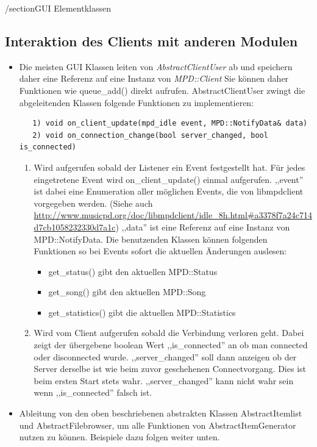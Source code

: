 /section{GUI Elementklassen}
\subsection{Interaktion des Clients mit anderen Modulen}
\begin{itemize}
\item Die meisten GUI Klassen leiten von \emph{AbstractClientUser} ab und speichern daher eine Referenz auf eine Instanz von \emph{MPD::Client}
      Sie können daher Funktionen wie queue\_add() direkt aufrufen.
      AbstractClientUser zwingt die abgeleitenden Klassen folgende Funktionen zu implementieren: 
\begin{verbatim} 
   1) void on_client_update(mpd_idle event, MPD::NotifyData& data)
   2) void on_connection_change(bool server_changed, bool is_connected)
\end{verbatim}
   \begin{enumerate}
   \item Wird aufgerufen sobald der Listener ein Event festgestellt hat. Für jedes eingetretene Event wird on\_client\_update()    
   einmal aufgerufen. ,,event'' ist dabei eine Enumeration aller möglichen Events, die von libmpdclient 
   vorgegeben werden. (Siehe auch \url{http://www.musicpd.org/doc/libmpdclient/idle\_8h.html#a3378f7a24c714d7cb1058232330d7a1c})
   ,,data'' ist eine Referenz auf eine Instanz von MPD::NotifyData. Die benutzenden Klassen können folgenden Funktionen so
   bei Events sofort die aktuellen Änderungen auslesen:
   \begin{itemize} 
     \item get\_status() gibt den aktuellen MPD::Status
     \item get\_song() gibt den aktuellen MPD::Song
     \item get\_statistics() gibt die aktuellen MPD::Statistics
   \end{itemize} 
   \item Wird vom Client aufgerufen sobald die Verbindung verloren geht.
         Dabei zeigt der übergebene boolean Wert ,,is\_connected'' an ob man connected oder disconnected wurde.
         ,,server\_changed'' soll dann anzeigen ob der Server derselbe ist wie beim zuvor geschehenen Connectvorgang.
         Dies ist beim ersten Start stets wahr. ,,server\_changed'' kann nicht wahr sein wenn ,,is\_connected'' falsch ist.
   \end{enumerate}
\item Ableitung von den oben beschriebenen abstrakten Klassen AbstractItemlist und AbstractFilebrowser, um alle Funktionen von AbstractItemGenerator nutzen zu können. Beispiele dazu folgen weiter unten.
\end{itemize}


